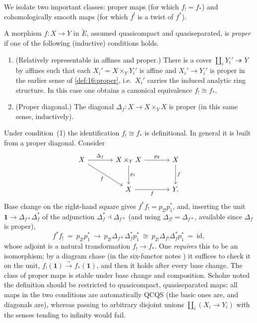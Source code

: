 We isolate two important classes: proper maps (for which $f_!=f_*$) and
cohomologically smooth maps (for which $f^!$ is a twist of $f^*$).

\begin{definition}
\label{def:21:proper}
A morphism $f\colon X\to Y$ in $\widetilde E$, assumed quasicompact and
quasiseparated, is \emph{proper} if one of the following (inductive) conditions
holds.
\begin{enumerate}
\item \textup{(Relatively representable in affines and proper.)} There is a cover
$\coprod_i Y_i'\twoheadrightarrow Y$ by affines such that each
$X_i'=X\times_Y Y_i'$ is affine and $X_i'\to Y_i'$ is proper in the earlier sense
of \cref{def:16:proper}, i.e.\ $X_i'$ carries the induced analytic ring
structure. In this case one obtains a canonical equivalence $f_!\cong f_*$.
\item \textup{(Proper diagonal.)} The diagonal
$\Delta_f\colon X\to X\times_Y X$ is proper (in this same sense, inductively).
\end{enumerate}
\end{definition}

\begin{remark}
\label{rmk:21:comparison-map}
Under condition~(1) the identification $f_!\cong f_*$ is definitional. In
general it is built from a proper diagonal. Consider
\begin{equation*}
\begin{tikzcd}[row sep=large, column sep=large]
X \arrow[r, "\Delta_f"] \arrow[dr, "f"'] & X\times_Y X \arrow[r, "p_2"] \arrow[d, "p_1"] & X \arrow[d, "f"] \\
& X \arrow[r, "f"'] & Y .
\end{tikzcd}
\end{equation*}
Base change on the right-hand square gives $f^{*}f_{!}=p_{2!}p_1^{*}$, and,
inserting the unit $\mathbf 1\to\Delta_{f*}\Delta_f^{*}$ of the adjunction
$\Delta_f^{*}\dashv\Delta_{f*}$ (and using $\Delta_{f!}=\Delta_{f*}$, available
since $\Delta_f$ is proper),
\begin{equation*}
f^{*}f_{!}\ =\ p_{2!}p_1^{*}\ \longrightarrow\
p_{2!}\Delta_{f*}\Delta_f^{*}p_1^{*}\ \cong\
p_{2!}\Delta_{f!}\Delta_f^{*}p_1^{*}\ =\ \mathrm{id},
\end{equation*}
whose adjoint is a natural transformation $f_{!}\to f_{*}$. One \emph{requires}
this to be an isomorphism; by a diagram chase (in the six-functor notes
\cite{scholze2023six}) it suffices to check it on the unit,
$f_!(\mathbf 1)\xrightarrow{\sim}f_*(\mathbf 1)$, and then it holds after every
base change. The class of proper maps is stable under base change and
composition. Scholze noted the definition should be restricted to quasicompact,
quasiseparated maps: all maps in the two conditions are automatically QCQS
(the basic ones are, and diagonals are), whereas passing to arbitrary disjoint
unions $\coprod_i(X_i\to Y_i)$ with the senses tending to infinity would fail.
\end{remark}

